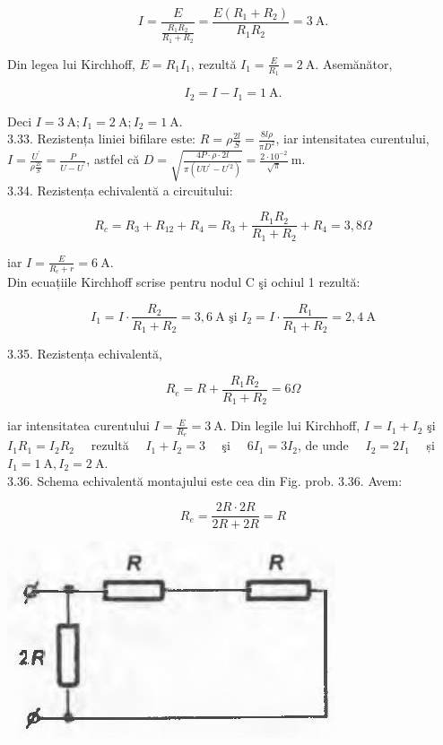 \documentclass[10pt]{article}
\begin{document}
$$
I=\frac{E}{\frac{R_{1} R_{2}}{R_{1}+R_{2}}}=\frac{E\left(R_{1}+R_{2}\right)}{R_{1} R_{2}}=3 \mathrm{~A} .
$$

Din legea lui Kirchhoff, $E=R_{1} I_{1}$, rezultă $I_{1}=\frac{E}{R_{1}}=2 \mathrm{~A}$. Asemănător,

$$
I_{2}=I-I_{1}=1 \mathrm{~A} .
$$

Deci $I=3 \mathrm{~A} ; I_{1}=2 \mathrm{~A} ; I_{2}=1 \mathrm{~A}$.\\
3.33. Rezistența liniei bifilare este: $R=\rho \frac{2 l}{S}=\frac{8 l \rho}{\pi D^{2}}$, iar intensitatea curentului, $I=\frac{U^{\prime}}{\rho \frac{2 l}{S}}=\frac{P}{U-U^{\prime}}$, astfel că $D=\sqrt{\frac{4 P \cdot \rho \cdot 2 l}{\pi\left(U U^{\prime}-U^{\prime 2}\right)}}=\frac{2 \cdot 10^{-2}}{\sqrt{\pi}} \mathrm{~m}$.\\
3.34. Rezistența echivalentă a circuitului:

$$
R_{c}=R_{3}+R_{12}+R_{4}=R_{3}+\frac{R_{1} R_{2}}{R_{1}+R_{2}}+R_{4}=3,8 \Omega
$$

iar $I=\frac{E}{R_{c}+r}=6 \mathrm{~A}$.\\
Din ecuațiile Kirchhoff scrise pentru nodul C şi ochiul 1 rezultă:

$$
I_{1}=I \cdot \frac{R_{2}}{R_{1}+R_{2}}=3,6 \mathrm{~A} \text { şi } I_{2}=I \cdot \frac{R_{1}}{R_{1}+R_{2}}=2,4 \mathrm{~A}
$$

3.35. Rezistența echivalentă,

$$
R_{e}=R+\frac{R_{1} R_{2}}{R_{1}+R_{2}}=6 \Omega
$$

iar intensitatea curentului $I=\frac{E}{R_{e}}=3 \mathrm{~A}$. Din legile lui Kirchhoff, $I=I_{1}+I_{2}$ şi $I_{1} R_{1}=I_{2} R_{2} \quad$ rezultă $\quad I_{1}+I_{2}=3 \quad$ şi $\quad 6 I_{1}=3 I_{2}$, de unde $\quad I_{2}=2 I_{1} \quad$ și $I_{1}=1 \mathrm{~A}, I_{2}=2 \mathrm{~A}$.\\
3.36. Schema echivalentă montajului este cea din Fig. prob. 3.36. Avem:

$$
R_{e}=\frac{2 R \cdot 2 R}{2 R+2 R}=R
$$

\begin{center}
\includegraphics[max width=\textwidth]{2025_07_01_5b3ff9fa0d508c8e9f17g-348}
\end{center}
\end{document}
